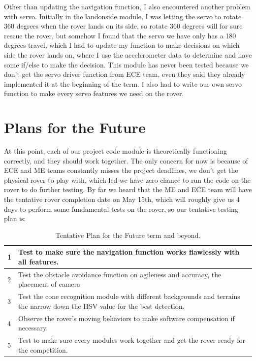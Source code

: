 \documentclass[10pt,letterpaper,onecolumn,draftclsnofoot,journal]{IEEEtran}
\begin{document}
Other than updating the navigation function, I also encountered another problem with servo. Initially in the landonside module, I was letting the servo to rotate 360 degrees when the rover lands on its side, so rotate 360 degrees will for sure rescue the rover, but somehow I found that the servo we have only has a 180 degrees travel, which I had to update my function to make decisions on which side the rover lands on, where I use the accelerometer data to determine and have some if/else to make the decision. This module has never been tested because we don't get the servo driver function from ECE team, even they said they already implemented it at the beginning of the term. I also had to write our own servo function to make every servo features we need on the rover.
\par

\section{\textbf{Plans for the Future}}
At this point, each of our project code module is theoretically functioning correctly, and they should work together. The only concern for now is because of ECE and ME teams constantly misses the project deadlines, we don't get the physical rover to play with, which led we have zero chance to run the code on the rover to do further testing. By far we heard that the ME and ECE team will have the tentative rover completion date on May 15th, which will roughly give us 4 days to perform some fundamental tests on the rover, so our tentative testing plan is: \par

\begin{table}[h!]
	\centering
	\caption{Tentative Plan for the Future term and beyond.}
	\label{tab:table1}
	\begin{tabular}{l l}
	
		\hline
		1   &Test to make sure the navigation function works flawlessly with all features. \\
		\hline
		2   &Test the obstacle avoidance function on agileness and accuracy, the placement of camera    \\
		\hline
		3   &Test the cone recognition module with different backgrounds and terrains the narrow down the HSV value for the best detection.  \\
		\hline
		4   &Observe the rover's moving behaviors to make software compensation if necessary. \\
		\hline
		5   &Test to make sure every modules work together and get the rover ready for the competition. \\
		\hline
	\end{tabular}
\end{table}
\end{document}
